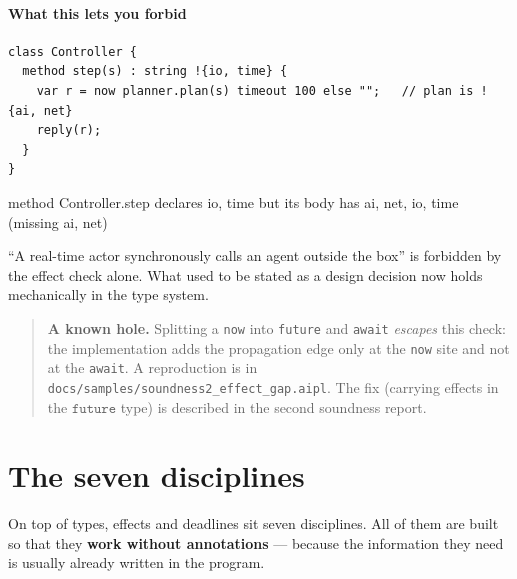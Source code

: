 \documentclass[11pt,a4paper]{article}
\newcommand{\ty}[1]{\ensuremath{\mathtt{#1}}}
\begin{document}
\subsection{What this lets you forbid}

\begin{lstlisting}
class Controller {
  method step(s) : string !{io, time} {
    var r = now planner.plan(s) timeout 100 else "";   // plan is !{ai, net}
    reply(r);
  }
}
\end{lstlisting}

\begin{term}
 method Controller.step declares {io, time}
  but its body has {ai, net, io, time} (missing {ai, net})
\end{term}

``A real-time actor synchronously calls an agent outside the box'' is forbidden
by the effect check alone. What used to be stated as a design decision now
holds mechanically in the type system.

\begin{quote}\small
\textbf{A known hole.} Splitting a \texttt{now} into \texttt{future} and
\texttt{await} \emph{escapes} this check: the implementation adds the
propagation edge only at the \texttt{now} site and not at the \texttt{await}.
A reproduction is in
\texttt{docs/samples/}\allowbreak\texttt{soundness2\_effect\_gap.aipl}.
The fix (carrying effects in the \ty{future} type) is described in the second
soundness report.
\end{quote}

\part{The seven disciplines}
\label{part:disciplines}

On top of types, effects and deadlines sit seven disciplines. All of them are
built so that they \textbf{work without annotations} --- because the
information they need is usually already written in the program.
\end{document}
